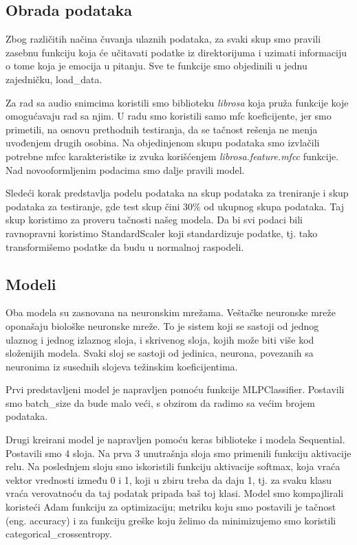 \documentclass{article}
\begin{document}
\subsection{Obrada podataka}
Zbog različitih načina čuvanja ulaznih podataka, za svaki skup smo pravili zasebnu funkciju koja će učitavati podatke iz direktorijuma i uzimati informaciju o tome koja je emocija u pitanju. Sve te funkcije smo objedinili u jednu zajedničku, load\_data. 

Za rad sa audio snimcima koristili smo biblioteku \textit{librosa} koja pruža funkcije koje omogućavaju rad sa njim. U radu smo koristili samo mfc koeficijente, jer smo primetili, na osnovu prethodnih testiranja, da se tačnost rešenja ne menja uvođenjem drugih osobina. Na objedinjenom skupu podataka smo izvlačili potrebne mfcc karakteristike iz zvuka korišćenjem \textit{librosa.feature.mfcc} funkcije. Nad novooformljenim podacima smo dalje pravili model.

Sledeći korak predstavlja podelu podataka na skup podataka za treniranje i skup podataka za testiranje, gde test skup čini 30\% od ukupnog skupa podataka. Taj skup koristimo za proveru tačnosti našeg modela. Da bi svi podaci bili ravnopravni koristimo StandardScaler koji standardizuje podatke, tj. tako transformišemo podatke da budu u normalnoj raspodeli.


\subsection{Modeli}
Oba modela su zasnovana na neuronskim mrežama. Veštačke neuronske mreže oponašaju biološke neuronske mreže. To je sistem koji se sastoji od jednog ulaznog i jednog izlaznog sloja, i skrivenog sloja, kojih može biti više kod složenijih modela. Svaki sloj se sastoji od jedinica, neurona, povezanih sa neuronima iz susednih slojeva težinskim koeficijentima.

Prvi predstavljeni model je napravljen pomoću funkcije MLPClassifier. Postavili smo batch\_size da bude malo veći, s obzirom da radimo sa većim brojem podataka.


Drugi kreirani model je napravljen pomoću keras biblioteke i modela Sequential. Postavili smo 4 sloja. Na prva 3 unutrašnja sloja smo primenili funkciju aktivacije relu. Na poslednjem sloju smo iskoristili funkciju aktivacije softmax, koja vraća vektor vrednosti između 0 i 1, koji u zbiru treba da daju 1, tj. za svaku klasu vraća verovatnoću da taj podatak pripada baš toj klasi. Model smo kompajlirali koristeći Adam funkciju za optimizaciju; metriku koju smo postavili je tačnost (eng. accuracy) i za funkciju greške koju želimo da minimizujemo smo koristili categorical\_crossentropy.
\end{document}
